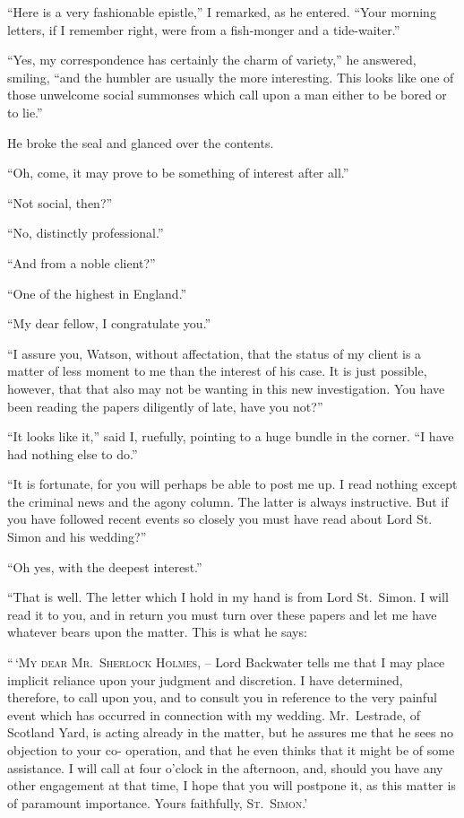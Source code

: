 “Here is a very fashionable epistle,” I remarked, as he
entered. “Your morning letters, if I remember right, were
from a fish-monger and a tide-waiter.”

“Yes, my correspondence has certainly the charm of variety,”
he answered, smiling, “and the humbler are usually
the more interesting. This looks like one of those unwelcome
social summonses which call upon a man either to be
bored or to lie.”

He broke the seal and glanced over the contents.

“Oh, come, it may prove to be something of interest after
all.”

“Not social, then?”

“No, distinctly professional.”

“And from a noble client?”

“One of the highest in England.”

“My dear fellow, I congratulate you.”

“I assure you, Watson, without affectation, that the status
of my client is a matter of less moment to me than the interest
of his case. It is just possible, however, that that also
may not be wanting in this new investigation. You have
been reading the papers diligently of late, have you not?”

“It looks like it,” said I, ruefully, pointing to a huge bundle
in the corner. “I have had nothing else to do.”

“It is fortunate, for you will perhaps be able to post me up.
I read nothing except the criminal news and the agony column.
The latter is always instructive. But if you have followed
recent events so closely you must have read about Lord St.
Simon and his wedding?”

“Oh yes, with the deepest interest.”

“That is well. The letter which I hold in my hand is
from Lord St.~Simon. I will read it to you, and in return
you must turn over these papers and let me have whatever
bears upon the matter. This is what he says:

\begin{letter}
“\,‘\textsc{My dear Mr.~Sherlock Holmes}, -- Lord Backwater
tells me that I may place implicit reliance upon your judgment
and discretion. I have determined, therefore, to call
upon you, and to consult you in reference to the very painful
event which has occurred in connection with my wedding.
Mr.~Lestrade, of Scotland Yard, is acting already in the matter,
but he assures me that he sees no objection to your co-%
operation, and that he even thinks that it might be of some
assistance. I will call at four o’clock in the afternoon, and,
should you have any other engagement at that time, I hope
that you will postpone it, as this matter is of paramount
importance. Yours faithfully, \textsc{St.~Simon}.’
\end{letter}

